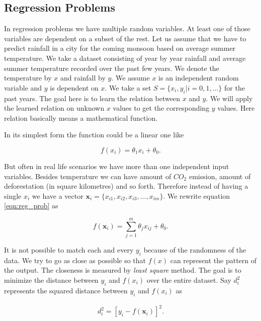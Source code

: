 \documentclass[english]{tktltiki}
\begin{document}
\subsection{Regression Problems}
\label{subsec:reg_prob}

In regression problems we have multiple random variables. At least one of those variables are dependent on a subset of the rest. Let us assume that we have to predict rainfall in a city for the coming monsoon based on average summer temperature. We take a dataset consisting of year by year rainfall and average summer temperature recorded over the past few years. We denote the temperature by $x$ and rainfall by $y$. We assume $x$ is an independent random variable and $y$ is dependent on $x$. We take a set $S = \{x_i, y_i|i = 0, 1, ...\}$ for the past years. The goal here is to learn the relation between $x$ and $y$. We will apply the learned relation on unknown $x$ values to get the corresponding $y$ values. Here relation basically means a mathematical function.

In its simplest form the function could be a linear one like

\begin{equation}
f(x_i) = \theta_1 x_i + \theta_0.
\label{eqn:reg_prob}
\end{equation}


But often in real life scenarios we have more than one independent input variables. Besides temperature we can have amount of $CO_2$ emission, amount of deforestation (in square kilometres) and so forth. Therefore instead of having a single $x_i$ we have a vector $\mathbf{x}_i = \{x_{i1}, x_{i2}, x_{i3}, ..., x_{im}\}$. We rewrite equation \ref{eqn:reg_prob} as

\begin{equation}
f(\mathbf{x}_i) = \sum_{j=1}^m \theta_j x_{ij} + \theta_0.
\end{equation}

It is not possible to match each and every $y_i$ because of the randomness of the data. We try to go as close as possible so that $f(x)$ can represent the pattern of the output. The closeness is measured by \textit{least square} method. The goal is to minimize the distance between $y_i$ and $f(x_i)$ over the entire dataset. Say $d^2_i$ represents the squared distance between $y_i$ and $f(x_i)$ as

\begin{eqnarray}
d^2_i = [y_i - f(\mathbf{x}_i)]^2.
\end{eqnarray}
\end{document}
